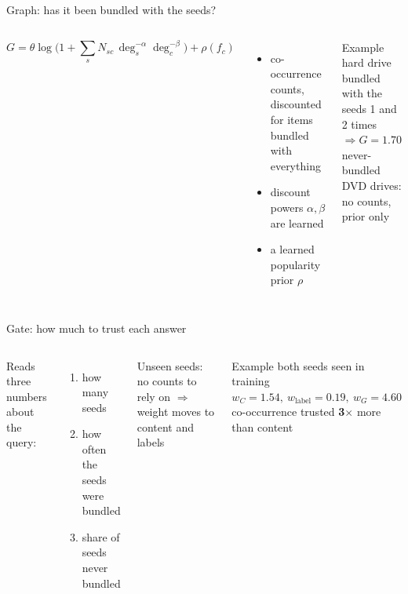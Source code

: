 \documentclass[aspectratio=169,11pt]{beamer}
\begin{document}
\begin{frame}{Graph: has it been bundled with the seeds?}
\begin{columns}[c]
{\small\[
G=\theta\log\!\Big(1+\textstyle\sum_{s}N_{sc}\,\deg_s^{-\alpha}\deg_c^{-\beta}\Big)+\rho(f_c)
\]}
\begin{itemize}\small
\item co-occurrence counts, \alert{discounted} for items bundled with everything
\item discount powers $\alpha,\beta$ are \alert{learned}
\item a learned \alert{popularity prior} $\rho$
\end{itemize}
\begin{block}{Example}\small
hard drive bundled with the seeds 1 and 2 times\\[2pt]
$\Rightarrow G=1.70$\\[3pt]
never-bundled DVD drives: no counts, prior only
\end{block}
\end{columns}
\end{frame}

\begin{frame}{Gate: how much to trust each answer}
\begin{columns}[c]
Reads three numbers about the query:
\begin{enumerate}\small
\item how many seeds
\item how often the seeds were bundled
\item share of seeds never bundled
\end{enumerate}
\vspace{2mm}
\small Unseen seeds: no counts to rely on $\Rightarrow$ weight moves to \alert{content and labels}
\begin{block}{Example}\small
both seeds seen in training\\[2pt]
$w_C=1.54,\ w_{\text{label}}=0.19,\ w_G=\mathbf{4.60}$\\[2pt]
co-occurrence trusted \textbf{3$\times$} more than content
\end{block}
\end{columns}
\end{frame}
\end{document}

